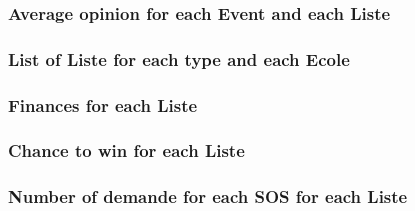 \documentclass[a4paper,oneside,1pt]{article}
\begin{document}
\subsubsection{Average opinion for each Event and each Liste} 

\subsubsection{List of Liste for each type and each Ecole}
\subsubsection{Finances for each Liste}
\subsubsection{Chance to win for each Liste}
\subsubsection{Number of demande for each SOS for each Liste}
\end{document}
